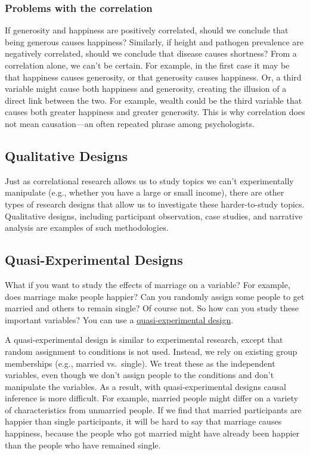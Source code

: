 \documentclass[
]{krantz}
\begin{document}
\subsubsection*{Problems with the correlation}\label{problems-with-the-correlation}


If generosity and happiness are positively correlated, should we conclude that being generous causes happiness? Similarly, if height and pathogen prevalence are negatively correlated, should we conclude that disease causes shortness? From a correlation alone, we can't be certain. For example, in the first case it may be that happiness causes generosity, or that generosity causes happiness. Or, a third variable might cause both happiness and generosity, creating the illusion of a direct link between the two. For example, wealth could be the third variable that causes both greater happiness and greater generosity. This is why correlation does not mean causation---an often repeated phrase among psychologists.

\subsection*{Qualitative Designs}\label{qualitative-designs}


Just as correlational research allows us to study topics we can't experimentally manipulate (e.g., whether you have a large or small income), there are other types of research designs that allow us to investigate these harder-to-study topics. Qualitative designs, including participant observation, case studies, and narrative analysis are examples of such methodologies.

\subsection*{Quasi-Experimental Designs}\label{quasi-experimental-designs}


What if you want to study the effects of marriage on a variable? For example, does marriage make people happier? Can you randomly assign some people to get married and others to remain single? Of course not. So how can you study these important variables? You can use a \hyperref[quasi-experimental-design]{quasi-experimental design}.

A quasi-experimental design is similar to experimental research, except that random assignment to conditions is not used. Instead, we rely on existing group memberships (e.g., married vs.~single). We treat these as the independent variables, even though we don't assign people to the conditions and don't manipulate the variables. As a result, with quasi-experimental designs causal inference is more difficult. For example, married people might differ on a variety of characteristics from unmarried people. If we find that married participants are happier than single participants, it will be hard to say that marriage causes happiness, because the people who got married might have already been happier than the people who have remained single.
\end{document}
